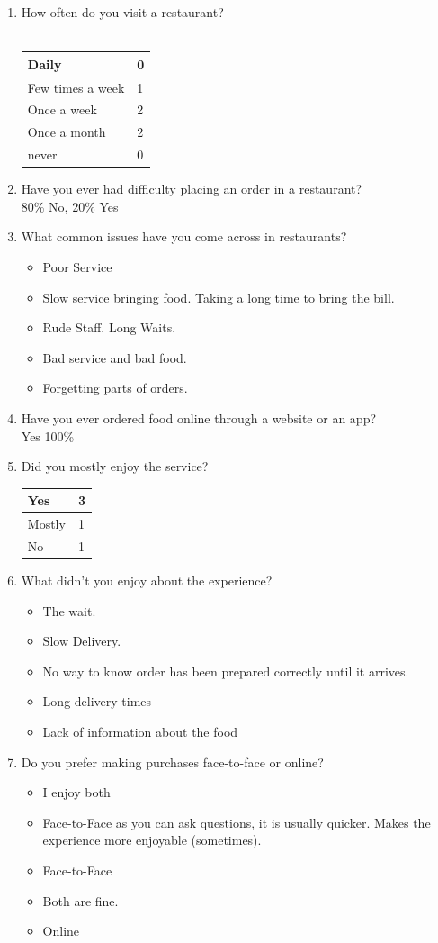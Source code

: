 \documentclass[11pt, a4paper]{report}
\begin{document}
\begin{enumerate} 
\item How often do you visit a restaurant? \\ \\
\begin{tabulary}{\textwidth}{| L l |}
\toprule
Daily & 0 \\ \midrule
Few times a week & 1 \\ \midrule
Once a week & 2 \\ \midrule
Once a month & 2 \\ \midrule
never & 0 \\ \bottomrule
\end{tabulary}
\item Have you ever had difficulty placing an order in a restaurant? \\ 80\% No, 20\% Yes %
\item What common issues have you come across in restaurants? 
\begin{itemize} 
\item Poor Service
\item Slow service bringing food. Taking a long time to bring the bill.
\item Rude Staff. Long Waits.
\item Bad service and bad food.
\item Forgetting parts of orders. 
\end{itemize} 
\item Have you ever ordered food online through a website or an app?\\
Yes 100\%
\item Did you mostly enjoy the service? 
\begin{tabulary}{\textwidth}{| L l |}
\toprule
Yes & 3 \\ \midrule
Mostly & 1 \\ \midrule
No & 1 \\ \bottomrule
\end{tabulary}
\item{What didn't you enjoy about the experience?} 
\begin{itemize} 
\item The wait.
\item Slow Delivery. 
\item No way to know order has been prepared correctly until it arrives.
\item Long delivery times
\item Lack of information about the food
\end{itemize} 
\item Do you prefer making purchases face-to-face or online?
\begin{itemize} 
\item I enjoy both
\item Face-to-Face as you can ask questions, it is usually quicker. Makes the experience more enjoyable (sometimes).
\item Face-to-Face
\item Both are fine.
\item Online 
\end{itemize} 
\end{enumerate} 
\end{document}

